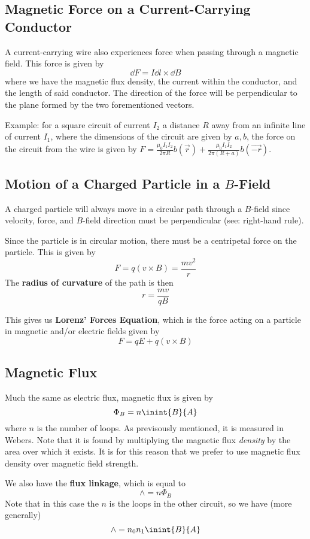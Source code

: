 \documentclass[12pt]{article}
\begin{document}
\subsection*{Magnetic Force on a Current-Carrying Conductor}
A current-carrying wire also experiences force when passing through a magnetic field. This force is given by \[ \dd F = I \dd l \times\dd B \] where we have the magnetic flux density, the current within the conductor, and the length of said conductor. The direction of the force will be perpendicular to the plane formed by the two forementioned vectors.

Example: for a square circuit of current $I_2$ a distance $R$ away from an infinite line of current $I_1$, where the dimensions of the circuit are given by $a,b$, the force on the circuit from the wire is given by $F = \frac{\mu_0 I_1 I_2}{2\pi R} b (\vec{r}) + \frac{\mu_0 I_1 I_2}{2\pi (R + a)} b (\vec{-r})$.

\subsection*{Motion of a Charged Particle in a $B$-Field}
A charged particle will always move in a circular path through a $B$-field since velocity, force, and $B$-field direction must be perpendicular (see: right-hand rule).

Since the particle is in circular motion, there must be a centripetal force on the particle. This is given by \[ F = q(v \times B) = \frac{mv^2}{r} \] The {\bf radius of curvature} of the path is then \[ r = \frac{mv}{qB} \]

This gives us {\bf Lorenz' Forces Equation}, which is the force acting on a particle in magnetic and/or electric fields given by \[ F = qE + q(v \times B) \]

\subsection*{Magnetic Flux}
Much the same as electric flux, magnetic flux is given by \[ \Phi_B = n\inint{B}{A} \] where $n$ is the number of loops. As previsously mentioned, it is measured in Webers. Note that it is found by multiplying the magnetic flux \emph{density} by the area over which it exists. It is for this reason that we prefer to use magnetic flux density over magnetic field strength.

We also have the {\bf flux linkage}, which is equal to \[ \land = n\Phi_B \] Note that in this case the $n$ is the loops in the other circuit, so we have (more generally) \[ \land = n_0n_1 \inint{B}{A} \]
\end{document}

